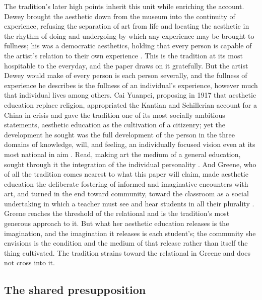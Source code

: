 The tradition's later high points inherit this unit while enriching the account. Dewey brought the aesthetic down from the museum into the continuity of experience, refusing the separation of art from life and locating the aesthetic in the rhythm of doing and undergoing by which any experience may be brought to fullness; his was a democratic aesthetics, holding that every person is capable of the artist's relation to their own experience \parencite{dewey1934}. This is the tradition at its most hospitable to the everyday, and the paper draws on it gratefully. But the artist Dewey would make of every person is each person severally, and the fullness of experience he describes is the fullness of an individual's experience, however much that individual lives among others. Cai Yuanpei, proposing in 1917 that aesthetic education replace religion, appropriated the Kantian and Schillerian account for a China in crisis and gave the tradition one of its most socially ambitious statements, aesthetic education as the cultivation of a citizenry; yet the development he sought was the full development of the person in the three domains of knowledge, will, and feeling, an individually focused vision even at its most national in aim \parencite{caiyuanpei1917}. Read, making art the medium of a general education, sought through it the integration of the individual personality \parencite{read1943}. And Greene, who of all the tradition comes nearest to what this paper will claim, made aesthetic education the deliberate fostering of informed and imaginative encounters with art, and turned in the end toward community, toward the classroom as a social undertaking in which a teacher must see and hear students in all their plurality \parencite{greene1995}. Greene reaches the threshold of the relational and is the tradition's most generous approach to it. But what her aesthetic education releases is the imagination, and the imagination it releases is each student's; the community she envisions is the condition and the medium of that release rather than itself the thing cultivated. The tradition strains toward the relational in Greene and does not cross into it.

\subsection{The shared presupposition}
\label{p23:sub:edu-presupposition}

